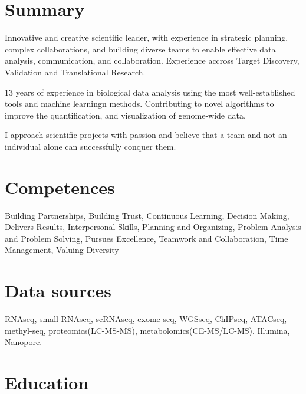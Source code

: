 \hypertarget{summary}{%
\section{Summary}\label{summary}}

Innovative and creative scientific leader, with experience in strategic planning, complex collaborations, and building diverse teams to enable effective data analysis, communication, and collaboration. Experience accross Target Discovery, Validation and Translational Research.

13 years of experience in biological data analysis using the most well-established tools and machine learningn methods.
Contributing to novel algorithms to improve the quantification, and visualization of genome-wide data. 

I approach scientific projects with passion and believe that a
team and not an individual alone can successfully conquer them.

\hypertarget{competences}{%
\section{Competences}\label{competences}}

Building Partnerships, Building Trust, Continuous Learning, Decision
Making, Delivers Results, Interpersonal Skills, Planning and Organizing,
Problem Analysis and Problem Solving, Pursues Excellence, Teamwork and
Collaboration, Time Management, Valuing Diversity

\hypertarget{Data sources}{%
\section{Data sources}\label{data}}

RNAseq, small RNAseq, scRNAseq, exome-seq, WGSseq, ChIPseq, ATACseq, methyl-seq, proteomics(LC-MS-MS), metabolomics(CE-MS/LC-MS). Illumina, Nanopore.

\hypertarget{education}{%
\section{Education}\label{education}}

